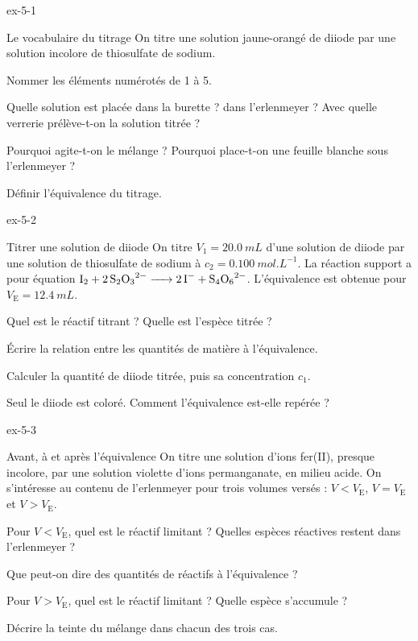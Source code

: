 \begin{blocLivre}{ex-5-1}
\begin{exercice}[1]{Le vocabulaire du titrage}
On titre une solution jaune-orangé de diiode par une solution incolore de thiosulfate de sodium.
\begin{questions}
\item Nommer les éléments numérotés de 1 à 5.
\item Quelle solution est placée dans la burette ? dans l'erlenmeyer ? Avec quelle verrerie prélève-t-on la solution titrée ?
\item Pourquoi agite-t-on le mélange ? Pourquoi place-t-on une feuille blanche sous l'erlenmeyer ?
\item Définir l'équivalence du titrage.
\end{questions}
\end{exercice}
\end{blocLivre}
\begin{blocLivre}{ex-5-2}
\begin{exercice}[1]{Titrer une solution de diiode}
On titre $V_1=\qty{20,0}{mL}$ d'une solution de diiode par une solution de thiosulfate de sodium à $c_2=\qty{0,100}{mol.L^{-1}}$. La
réaction support a pour équation $\ce{I2 + 2S2O3^{2-} -> 2I- + S4O6^{2-}}$. L'équivalence est obtenue pour $V_\mathrm{E}=\qty{12,4}{mL}$.
\begin{questions}
\item Quel est le réactif titrant ? Quelle est l'espèce titrée ?
\item Écrire la relation entre les quantités de matière à l'équivalence.
\item Calculer la quantité de diiode titrée, puis sa concentration $c_1$.
\item Seul le diiode est coloré. Comment l'équivalence est-elle repérée ?
\end{questions}
\end{exercice}
\end{blocLivre}
\begin{blocLivre}{ex-5-3}
\begin{exercice}[1]{Avant, à et après l'équivalence}
On titre une solution d'ions fer(II), presque incolore, par une solution violette d'ions permanganate, en milieu acide.
On s'intéresse au contenu de l'erlenmeyer pour trois volumes versés : $V<V_\mathrm{E}$, $V=V_\mathrm{E}$ et $V>V_\mathrm{E}$.
\begin{questions}
\item Pour $V<V_\mathrm{E}$, quel est le réactif limitant ? Quelles espèces réactives restent dans l'erlenmeyer ?
\item Que peut-on dire des quantités de réactifs à l'équivalence ?
\item Pour $V>V_\mathrm{E}$, quel est le réactif limitant ? Quelle espèce s'accumule ?
\item Décrire la teinte du mélange dans chacun des trois cas.
\end{questions}
\end{exercice}
\end{blocLivre}
